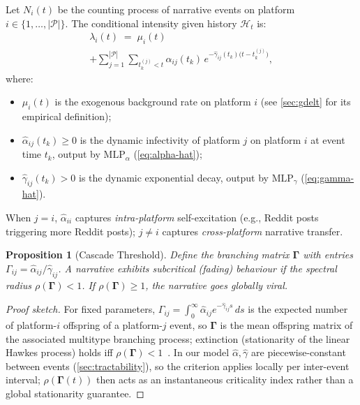 \documentclass[11pt]{article}
\newtheorem{proposition}{Proposition}
\newcommand{\cH}{\mathcal{H}}
\newcommand{\cP}{\mathcal{P}}
\begin{document}
Let $N_i(t)$ be the counting process of narrative events on platform $i
\in\{1,\ldots,|\cP|\}$. The conditional intensity given history $\cH_t$ is:
\begin{multline}
  \lambda_i(t)
  \;=\;
  \mu_i(t) \\
  + \sum_{j=1}^{|\cP|}
    \sum_{t_k^{(j)} < t}
    \hat{\alpha}_{ij}(t_k)\,
    e^{-\hat{\gamma}_{ij}(t_k)\bigl(t - t_k^{(j)}\bigr)},
  \label{eq:hawkes-intensity}
\end{multline}
where:
\begin{itemize}[noitemsep]
  \item $\mu_i(t)$ is the exogenous background rate on platform $i$
        (see \cref{sec:gdelt} for its empirical definition);
  \item $\hat{\alpha}_{ij}(t_k)\ge 0$ is the dynamic infectivity of platform $j$
        on platform $i$ at event time $t_k$, output by $\mathrm{MLP}_\alpha$
        (\cref{eq:alpha-hat});
  \item $\hat{\gamma}_{ij}(t_k) > 0$ is the dynamic exponential decay, output
        by $\mathrm{MLP}_\gamma$ (\cref{eq:gamma-hat}).
\end{itemize}
When $j=i$, $\hat{\alpha}_{ii}$ captures \emph{intra-platform} self-excitation
(e.g., Reddit posts triggering more Reddit posts); $j\neq i$ captures
\emph{cross-platform} narrative transfer.

\begin{proposition}[Cascade Threshold]
Define the branching matrix $\bm{\Gamma}$ with entries
$\Gamma_{ij} = \hat{\alpha}_{ij}/\hat{\gamma}_{ij}$. A narrative exhibits
subcritical (fading) behaviour if the spectral radius $\rho(\bm{\Gamma}) < 1$.
If $\rho(\bm{\Gamma}) \ge 1$, the narrative goes globally viral.
\end{proposition}

\begin{proof}[Proof sketch]
For fixed parameters, $\Gamma_{ij} = \int_0^\infty
\hat{\alpha}_{ij} e^{-\hat{\gamma}_{ij} s}\, ds$ is the expected number of
platform-$i$ offspring of a platform-$j$ event, so $\bm{\Gamma}$ is the mean
offspring matrix of the associated multitype branching process; extinction
(stationarity of the linear Hawkes process) holds iff
$\rho(\bm{\Gamma}) < 1$~\citep{hawkes1971spectra,bremaud1996stability}. In our
model $\hat\alpha, \hat\gamma$ are piecewise-constant between events
(\cref{sec:tractability}), so the criterion applies locally per inter-event
interval; $\rho(\bm{\Gamma}(t))$ then acts as an instantaneous criticality
index rather than a global stationarity guarantee.
\end{proof}
\end{document}
